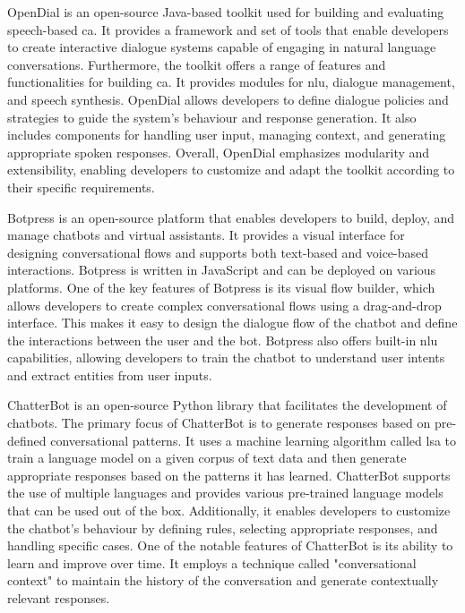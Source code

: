 \documentclass[a4paper,fleqn]{cas-dc}
\begin{document}
OpenDial \cite{opendial} is an open-source Java-based toolkit used for building and evaluating speech-based \gls{ca}. It provides a framework and set of tools that enable developers to create interactive dialogue systems capable of engaging in natural language conversations. Furthermore, the toolkit offers a range of features and functionalities for building \gls{ca}. It provides modules for \gls{nlu}, dialogue management, and speech synthesis. OpenDial allows developers to define dialogue policies and strategies to guide the system's behaviour and response generation. It also includes components for handling user input, managing context, and generating appropriate spoken responses. Overall, OpenDial emphasizes modularity and extensibility, enabling developers to customize and adapt the toolkit according to their specific requirements. 

Botpress \cite{botpress} is an open-source platform that enables developers to build, deploy, and manage chatbots and virtual assistants. It provides a visual interface for designing conversational flows and supports both text-based and voice-based interactions. Botpress is written in JavaScript and can be deployed on various platforms. One of the key features of Botpress is its visual flow builder, which allows developers to create complex conversational flows using a drag-and-drop interface. This makes it easy to design the dialogue flow of the chatbot and define the interactions between the user and the bot. Botpress also offers built-in \gls{nlu} capabilities, allowing developers to train the chatbot to understand user intents and extract entities from user inputs.

ChatterBot \cite{chatterbot} is an open-source Python library that facilitates the development of chatbots. The primary focus of ChatterBot is to generate responses based on pre-defined conversational patterns. It uses a machine learning algorithm called \gls{lsa} to train a language model on a given corpus of text data and  then generate appropriate responses based on the patterns it has learned. ChatterBot supports the use of multiple languages and provides various pre-trained language models that can be used out of the box. Additionally, it enables developers to customize the chatbot's behaviour by defining rules, selecting appropriate responses, and handling specific cases. One of the notable features of ChatterBot is its ability to learn and improve over time. It employs a technique called "conversational context" to maintain the history of the conversation and generate contextually relevant responses. 
\end{document}
